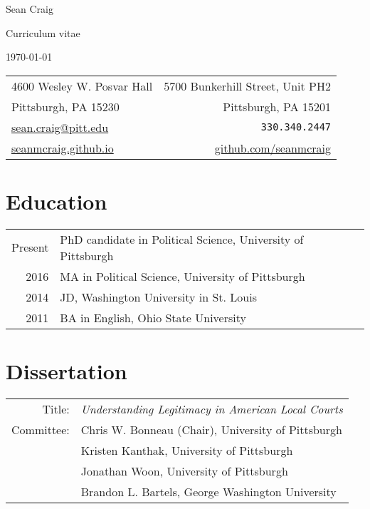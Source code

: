 \documentclass[12pt,letterpaper]{article}
\begin{document}
\begin{center}
  {\Large  Sean Craig} \par
  Curriculum vitae \par
  \today \par
\end{center}

\begin{tabularx}{\textwidth}{@{}XR@{}}
  4600 Wesley W. Posvar Hall & 5700 Bunkerhill Street, Unit PH2 \\
  Pittsburgh, PA 15230 & Pittsburgh, PA 15201 \\
  \href{mailto:sean.craig@pitt.edu}{sean.craig@pitt.edu} & {\tt 330.340.2447} \\
  \href{https://seanmcraig.github.io}{seanmcraig.github.io} & \href{https://github.com/seanmcraig}{github.com/seanmcraig}\\
\end{tabularx} \par\bigskip\bigskip

\section*{\sf Education}
\begin{tabularx}{\textwidth}{@{}DX@{}}
  Present & PhD candidate in Political Science, University of Pittsburgh \\
  2016 & MA in Political Science, University of Pittsburgh \\
  2014 & JD, Washington University in St. Louis \\
  2011 & BA in English, Ohio State University \\
\end{tabularx} \par\bigskip\bigskip

\section*{\sf Dissertation}
\begin{tabularx}{\textwidth}{@{}DX@{}}
  Title: & {\em Understanding Legitimacy in American Local Courts} \\
  Committee: & Chris W. Bonneau (Chair), University of Pittsburgh \\
  & Kristen Kanthak, University of Pittsburgh \\
  & Jonathan Woon, University of Pittsburgh \\
  & Brandon L. Bartels, George Washington University
\end{tabularx} \par\bigskip
\end{document}
